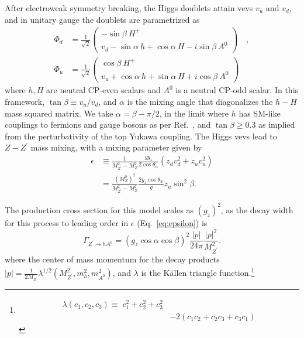  After electroweak symmetry breaking, the Higgs doublets attain vevs $v_u$ and $v_d$, and in unitary gauge the doublets are parametrized as
 \begin{align}
 \Phi_d &= \frac{1}{\sqrt{2}}
 \begin{pmatrix}
 -\sin{\beta} \ H^+ \\ v_d - \sin{\alpha} \ h + \cos{\alpha} \ H - i \sin{\beta} \ A^0
 \end{pmatrix} 
 \quad , \nonumber \\
 \Phi_u &= \frac{1}{\sqrt{2}}
 \begin{pmatrix}
 \cos{\beta} \ H^+ \\ v_u + \cos{\alpha} \ h + \sin{\alpha} \ H + i \cos{\beta} \ A^0
 \end{pmatrix}
 \end{align}
 where $h,H$ are neutral CP-even scalars and $A^0$ is a neutral CP-odd scalar. 
 In this framework, $\tan{\beta} \equiv v_u/v_d$, and $\alpha$ is the mixing angle that diagonalizes 
 the $h - H$ mass squared matrix. 
We take $\alpha = \beta - \pi/2$, in the 
limit where $h$ has SM-like couplings to fermions and 
gauge bosons as per Ref.~\cite{Craig:2013hca}, and $\tan{\beta} \ge 0.3$ 
as implied from the perturbativity of the top Yukawa coupling. 
The Higgs vevs lead to $Z-Z^\prime$ mass mixing, with a mixing parameter given by 
 \begin{align}
 \epsilon & \equiv \frac{1}{M_{Z^\prime}^2 - M_Z^2} \frac{g g_z}{2 \cos{\theta_w}} ( z_d v_d^2 + z_u v_u^2) \nonumber \\
 & =  \frac{(M_Z^0)^2}{M_{Z^\prime}^2 - M_Z^2} \frac{2 g_z \cos \theta_w}{g}  z_u \sin^2 \beta.
 \label{eq:epsilon}
 \quad
 \end{align}
  
The production cross section for this model scales as $(g_z)^2$, as the decay width for this process
to leading order in $\epsilon$ (Eq.~\ref{eq:epsilon}) is
\begin{equation}
\Gamma_{Z^\prime \to h A^0} =  (g_z \cos \alpha \cos \beta)^2 \frac{|p|}{24 \pi} \frac{|p|^2}{M_{Z^\prime}^2}.
\end{equation}
where the center of mass momentum for the decay products $|p| =
\frac{1}{2 M_{Z^\prime}} \lambda^{1/2}(M_{Z^\prime}^2,m_h^2, m_{A^0}^2)$, and
$\lambda$ is the K\"{a}llen triangle function.\footnote{\begin{align*}\lambda(c_1,c_2,c_3) \equiv\;c_1^2 + c_2^2 + c_3^2\\ &- 2(c_1 c_2 + c_2 c_3 + c_3 c_1)\end{align*}}
   
